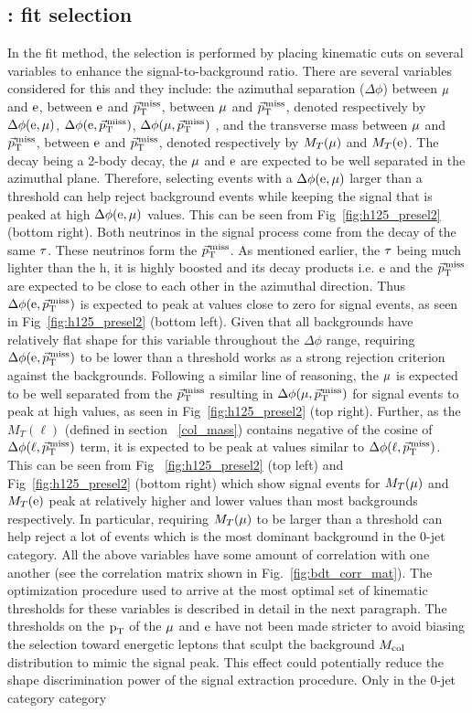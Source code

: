\subsection{\hmue: \mcol fit selection}
\label{h125_cb_sel}
In the \mcol fit method, the selection is performed by placing kinematic cuts on several variables to enhance the signal-to-background ratio. There are several variables considered for this and they include: the azimuthal separation ($\Delta\phi$) between $\mu$ and $\text{e}$, between $\text{e}$ and ${\vec p}_{\mathrm{T}}^{\kern1pt\text{miss}}$, between $\mu$ and ${\vec p}_{\mathrm{T}}^{\kern1pt\text{miss}}$, denoted respectively by $\Delta\phi(\text{e}, \mu)$, $\Delta\phi(\text{e}, {\vec p}_{\mathrm{T}}^{\kern1pt\text{miss}})$, $\Delta\phi(\mu, {\vec p}_{\mathrm{T}}^{\kern1pt\text{miss}})$ , and the transverse mass between $\mu$ and ${\vec p}_{\mathrm{T}}^{\kern1pt\text{miss}}$, between $\text{e}$ and ${\vec p}_{\mathrm{T}}^{\kern1pt\text{miss}}$, denoted respectively by $M_T(\mu)$ and $M_T(\text{e})$. The \hmue decay being a 2-body decay, the $\mu$ and $\text{e}$ are expected to be well separated in the azimuthal plane. Therefore, selecting events with a $\Delta\phi(\text{e}, \mu)$ larger than a threshold can help reject background events while keeping the signal that is peaked at high $\Delta\phi(\text{e}, \mu)$ values. This can be seen from Fig~\ref{fig:h125_presel2} (bottom right). Both neutrinos in the signal process come from the decay of the same $\tau$. These neutrinos form the ${\vec p}_{\mathrm{T}}^{\kern1pt\text{miss}}$. As mentioned earlier, the $\tau$ being much lighter than the h, it is highly boosted and its decay products i.e. $\text{e}$ and the ${\vec p}_{\mathrm{T}}^{\kern1pt\text{miss}}$ are expected to be close to each other in the azimuthal direction. Thus $\Delta\phi(\text{e}, {\vec p}_{\mathrm{T}}^{\kern1pt\text{miss}})$ is expected to peak at values close to zero for signal events, as seen in Fig~\ref{fig:h125_presel2} (bottom left). Given that all backgrounds have relatively flat shape for this variable  throughout the $\Delta\phi$ range, requiring $\Delta\phi(\text{e}, {\vec p}_{\mathrm{T}}^{\kern1pt\text{miss}})$ to be lower than a threshold works as a strong rejection criterion against the backgrounds. Following a similar line of reasoning, the $\mu$ is expected to be well separated from the ${\vec p}_{\mathrm{T}}^{\kern1pt\text{miss}}$ resulting in $\Delta\phi(\mu, {\vec p}_{\mathrm{T}}^{\kern1pt\text{miss}})$ for signal events to peak at high values, as seen in Fig~\ref{fig:h125_presel2} (top right). Further, as the $M_T(\ell)$ (defined in section ~\ref{col_mass}) contains negative of the cosine of $\Delta\phi(\ell, {\vec p}_{\mathrm{T}}^{\kern1pt\text{miss}})$ term, it is expected to be peak at values similar to $\Delta\phi(\ell, {\vec p}_{\mathrm{T}}^{\kern1pt\text{miss}})$. This can be seen from Fig ~\ref{fig:h125_presel2} (top left) and Fig~\ref{fig:h125_presel2} (bottom right) which show signal events for $M_T(\mu)$ and $M_T(\text{e})$ peak at relatively higher and lower values than most backgrounds respectively. In particular, requiring $M_T(\mu)$ to be larger than a threshold can help reject a lot of \ztt events which is the most dominant background in the 0-jet category. All the above variables have some amount of correlation with one another (see the correlation matrix shown in Fig.~\ref{fig:bdt_corr_mat}). The optimization procedure used to arrive at the most optimal set of kinematic thresholds for these variables is described in detail in the next paragraph. The thresholds on the $\text{p}_\text{T}$ of the $\mu$ and $\text{e}$ have not been made stricter to avoid biasing the selection toward energetic leptons that sculpt the background $M_{\text{col}}$ distribution to mimic the signal peak. This effect could potentially reduce the shape discrimination power of the signal extraction procedure. Only in the 0-jet category category 